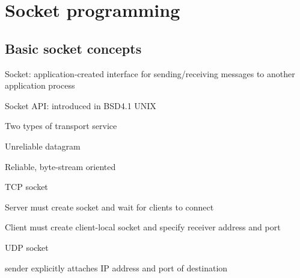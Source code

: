 \section{Socket programming}

\subsection{Basic socket concepts}
\enumstart
	\item Socket: application-created interface for sending/receiving messages to another application process
	\item Socket API: introduced in BSD4.1 UNIX
	\item Two types of transport service
	\enumstart
		\item Unreliable datagram
		\item Reliable, byte-stream oriented
	\enumend
	\item TCP socket
	\enumstart
		\item Server must create socket and wait for clients to connect
		\item Client must create client-local socket and specify receiver address and port
	\enumend
	\item UDP socket
	\enumstart
		\item sender explicitly attaches IP address and port of destination
	\enumend
\enumend

